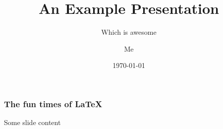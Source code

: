 \documentclass[xcolor={table}]{beamer}
\title{An Example Presentation}
\institute{3Basdjgf}
\subtitle{Which is awesome}
\author{Me}
\date{\today}
\begin{document}
\begin{frame}
\maketitle
\end{frame}

\begin{frame}
  \frametitle{The fun times of \LaTeX}

  Some slide content

\end{frame}
\end{document}
